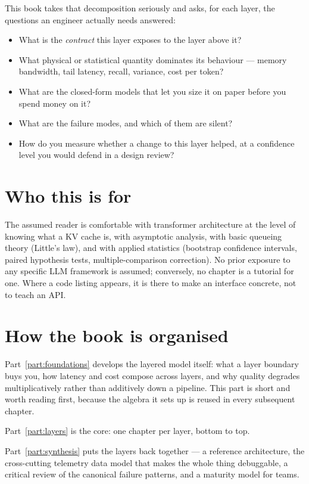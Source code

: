 \documentclass[11pt,twoside,openright]{book}
\theoremstyle{definition}
\theoremstyle{plain}
\theoremstyle{remark}
\begin{document}
This book takes that decomposition seriously and asks, for each layer, the
questions an engineer actually needs answered:

\begin{itemize}[leftmargin=1.4em,itemsep=2pt]
  \item What is the \emph{contract} this layer exposes to the layer above it?
  \item What physical or statistical quantity dominates its behaviour ---
        memory bandwidth, tail latency, recall, variance, cost per token?
  \item What are the closed-form models that let you size it on paper before
        you spend money on it?
  \item What are the failure modes, and which of them are silent?
  \item How do you measure whether a change to this layer helped, at a
        confidence level you would defend in a design review?
\end{itemize}

\section*{Who this is for}

The assumed reader is comfortable with transformer architecture at the level of
knowing what a KV cache is, with asymptotic analysis, with basic queueing theory
(Little's law), and with applied statistics (bootstrap confidence intervals,
paired hypothesis tests, multiple-comparison correction). No prior exposure to
any specific LLM framework is assumed; conversely, no chapter is a tutorial for
one. Where a code listing appears, it is there to make an interface concrete,
not to teach an API.

\section*{How the book is organised}

Part~\ref{part:foundations} develops the layered model itself: what a layer
boundary buys you, how latency and cost compose across layers, and why quality
degrades multiplicatively rather than additively down a pipeline. This part is
short and worth reading first, because the algebra it sets up is reused in every
subsequent chapter.

Part~\ref{part:layers} is the core: one chapter per layer, bottom to top.

Part~\ref{part:synthesis} puts the layers back together --- a reference
architecture, the cross-cutting telemetry data model that makes the whole thing
debuggable, a critical review of the canonical failure patterns, and a maturity
model for teams.
\end{document}
